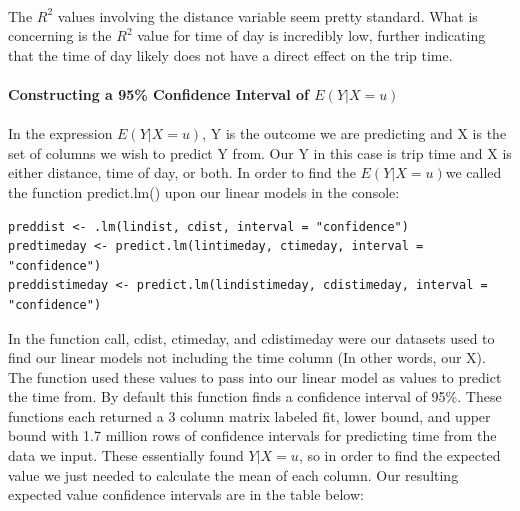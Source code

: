 \documentclass[letterpaper, 12 pt, conference]{article}
\begin{document}
\\The $R^2$ values involving the distance variable seem pretty standard. What is concerning is the $R^2$ value for time of day is incredibly low, further indicating that the time of day likely does not have a direct effect on the trip time. 
\\
\\
\textbf{Constructing a 95\% Confidence Interval of $E(Y|X=u)$}
\\ 
\\ In the expression $E(Y|X=u)$, Y is the outcome we are predicting and X is the set of columns we wish to predict Y from. Our Y in this case is trip time and X is either distance, time of day, or both. In order to find the $E(Y|X=u)$we called the function predict.lm() upon our linear models in the console:
\begin{lstlisting}
preddist <- .lm(lindist, cdist, interval = "confidence")
predtimeday <- predict.lm(lintimeday, ctimeday, interval = "confidence")
preddistimeday <- predict.lm(lindistimeday, cdistimeday, interval = "confidence")
\end{lstlisting}
In the function call, cdist, ctimeday, and cdistimeday were our datasets used to find our linear models not including the time column (In other words, our X). The function used these values to pass into our linear model as values to predict the time from. By default this function finds a confidence interval of 95\%. These functions each returned a 3 column matrix labeled fit, lower bound, and upper bound with 1.7 million rows of confidence intervals for predicting time from the data we input. These essentially found $Y|X=u$, so in order to find the expected value we just needed to calculate the mean of each column. Our resulting expected value confidence intervals are in the table below: 
\end{document}
